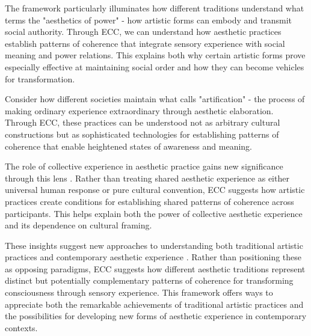 The framework particularly illuminates how different traditions understand what \cite{morphy1991ancestral} terms the "aesthetics of power" - how artistic forms can embody and transmit social authority. Through ECC, we can understand how aesthetic practices establish patterns of coherence that integrate sensory experience with social meaning and power relations. This explains both why certain artistic forms prove especially effective at maintaining social order and how they can become vehicles for transformation.

Consider how different societies maintain what \cite{dissanayake1992homo} calls "artification" - the process of making ordinary experience extraordinary through aesthetic elaboration. Through ECC, these practices can be understood not as arbitrary cultural constructions but as sophisticated technologies for establishing patterns of coherence that enable heightened states of awareness and meaning.

The role of collective experience in aesthetic practice gains new significance through this lens \cite{schieffelin1976sorrow}. Rather than treating shared aesthetic experience as either universal human response or pure cultural convention, ECC suggests how artistic practices create conditions for establishing shared patterns of coherence across participants. This helps explain both the power of collective aesthetic experience and its dependence on cultural framing.

These insights suggest new approaches to understanding both traditional artistic practices and contemporary aesthetic experience \cite{coote1992anthropology}. Rather than positioning these as opposing paradigms, ECC suggests how different aesthetic traditions represent distinct but potentially complementary patterns of coherence for transforming consciousness through sensory experience. This framework offers ways to appreciate both the remarkable achievements of traditional artistic practices and the possibilities for developing new forms of aesthetic experience in contemporary contexts.